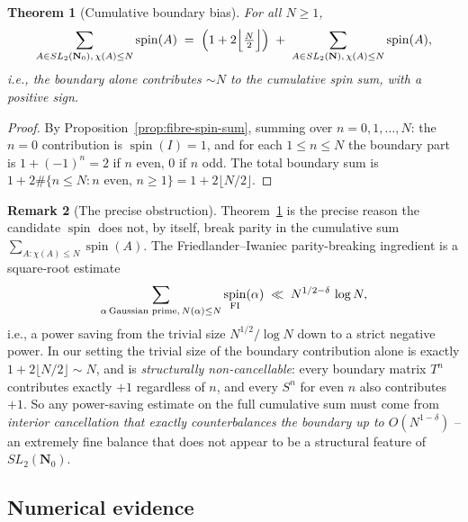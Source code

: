 \documentclass[11pt]{article}
\newtheorem{theorem}{Theorem}[section]
\theoremstyle{definition}
\newtheorem{remark}[theorem]{Remark}
\newcommand{\N}{\mathbf{N}}
\newcommand{\Nz}{\mathbf{N}_0}
\newcommand{\SLNz}{SL_2(\Nz)}
\newcommand{\SLN}{SL_2(\N)}
\DeclareMathOperator{\spin}{spin}
\begin{document}
\begin{theorem}[Cumulative boundary bias]\label{thm:cumulative-bias}
For all $N\ge 1$,
\begin{equation}\label{eq:cumulative-spin}
\sum_{A\in\SLNz,\,\chi(A)\le N}\spin(A)
\;=\;
\Bigl(1+2\Bigl\lfloor\tfrac{N}{2}\Bigr\rfloor\Bigr)
\;+\;
\sum_{A\in\SLN,\,\chi(A)\le N}\spin(A),
\end{equation}
i.e., the boundary alone contributes $\sim N$ to the cumulative spin
sum, with a positive sign.
\end{theorem}

\begin{proof}
By Proposition~\ref{prop:fibre-spin-sum}, summing over $n=0,1,\ldots,N$:
the $n=0$ contribution is $\spin(I)=1$, and for each $1\le n\le N$ the
boundary part is $1+(-1)^{n}=2$ if $n$ even, $0$ if $n$ odd. The total
boundary sum is $1+2\#\{n\le N:n\text{ even},\,n\ge 1\}
=1+2\lfloor N/2\rfloor$.
\end{proof}

\begin{remark}[The precise obstruction]\label{rem:precise-obstruction}
Theorem~\ref{thm:cumulative-bias} is the precise reason the candidate
$\spin$ does not, by itself, break parity in the cumulative sum
$\sum_{A:\chi(A)\le N}\spin(A)$. The Friedlander--Iwaniec parity-breaking
ingredient \cite[\S 4--5]{FI98b} is a square-root estimate
\[
\sum_{\alpha\,\text{Gaussian prime},\,N(\alpha)\le N}\spin_{\textnormal{FI}}(\alpha)
\;\ll\;N^{1/2-\delta}\,\log N,
\]
i.e., a power saving from the trivial size $N^{1/2}/\log N$ down to a
strict negative power. In our setting the trivial size of the boundary
contribution alone is exactly $1+2\lfloor N/2\rfloor\sim N$, and is
\emph{structurally non-cancellable}: every boundary matrix $T^{n}$
contributes exactly $+1$ regardless of $n$, and every $S^{n}$ for even
$n$ also contributes $+1$. So any power-saving estimate on the full
cumulative sum must come from \emph{interior cancellation that exactly
counterbalances the boundary up to $O(N^{1-\delta})$} -- an extremely
fine balance that does not appear to be a structural feature of $\SLNz$.
\end{remark}

\subsection{Numerical evidence}
\end{document}
